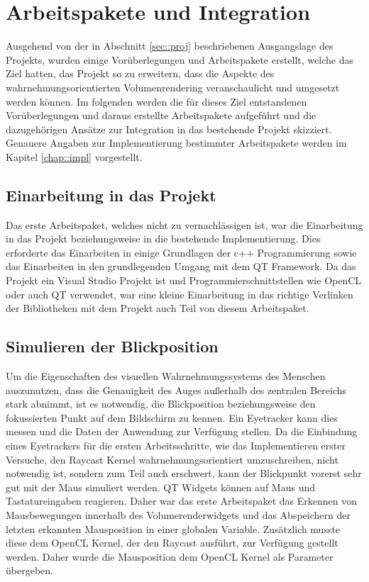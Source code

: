 \section{Arbeitspakete und Integration}\label{sec::workpacks}
Ausgehend von der in Abschnitt \ref{sec::proj} beschriebenen Ausgangslage des Projekts, wurden einige Vorüberlegungen und Arbeitspakete erstellt, welche das Ziel hatten, das Projekt so zu erweitern, dass die Aspekte des wahrnehmungsorientierten Volumenrendering veranschaulicht und umgesetzt werden können.
Im folgenden werden die für dieses Ziel entstandenen Vorüberlegungen und daraus erstellte Arbeitspakete aufgeführt und die dazugehörigen Ansätze zur Integration in das bestehende Projekt skizziert.
Genauere Angaben zur Implementierung bestimmter Arbeitspakete werden im Kapitel \ref{chap::impl} vorgestellt.

\subsection*{Einarbeitung in das Projekt}
Das erste Arbeitspaket, welches nicht zu vernachlässigen ist, war die Einarbeitung in das Projekt beziehungsweise in die bestehende Implementierung.
Dies erforderte das Einarbeiten in einige Grundlagen der c++ Programmierung sowie das Einarbeiten in den grundlegenden Umgang mit dem QT Framework.
Da das Projekt ein Visual Studio Projekt ist und Programmierschnittstellen wie OpenCL oder auch QT verwendet, war eine kleine Einarbeitung in das richtige Verlinken der Bibliotheken mit dem Projekt auch Teil von diesem Arbeitspaket.

\subsection*{Simulieren der Blickposition}
Um die Eigenschaften des visuellen Wahrnehmungssystems des Menschen auszunutzen, dass die Genauigkeit des Auges außerhalb des zentralen Bereichs stark abnimmt, ist es notwendig, die Blickposition beziehungsweise den fokussierten Punkt auf dem Bildschirm zu kennen.
Ein Eyetracker kann dies messen und die Daten der Anwendung zur Verfügung stellen.
Da die Einbindung eines Eyetrackers für die ersten Arbeitsschritte, wie das Implementieren erster Versuche, den Raycast Kernel wahrnehmungsorientiert umzuschreiben, nicht notwendig ist, sondern zum Teil auch erschwert, kann der Blickpunkt vorerst sehr gut mit der Maus simuliert werden.
QT Widgets können auf Maus und Tastatureingaben reagieren.
Daher war das erste Arbeitspaket das Erkennen von Mausbewegungen innerhalb des Volumerenderwidgets und das Abspeichern der letzten erkannten Mausposition in einer globalen Variable.
Zusätzlich musste diese dem OpenCL Kernel, der den Raycast ausführt, zur Verfügung gestellt werden.
Daher wurde die Mausposition dem OpenCL Kernel als Parameter übergeben.

